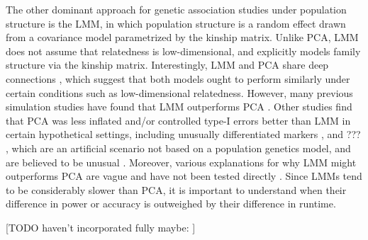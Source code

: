 \documentclass[11pt]{article}
\begin{document}
The other dominant approach for genetic association studies under population structure is the LMM, in which population structure is a random effect drawn from a covariance model parametrized by the kinship matrix.
Unlike PCA, LMM does not assume that relatedness is low-dimensional, and explicitly models family structure via the kinship matrix.
Interestingly, LMM and PCA share deep connections \citep{astle_population_2009, janss_inferences_2012, hoffman_correcting_2013}, which suggest that both models ought to perform similarly under certain conditions such as low-dimensional relatedness.
However, many previous simulation studies have found that LMM outperforms PCA \citep{
  zhao_arabidopsis_2007,
  astle_population_2009,
  kang_variance_2010,
  wu_comparison_2011, %
  song_testing_2015}.
Other studies find that PCA was less inflated and/or controlled type-I errors better than LMM in certain hypothetical settings, including unusually differentiated markers \citep{price_new_2010, wu_comparison_2011}, and ??? \citep{wang_analytical_2013}, which are an artificial scenario not based on a population genetics model, and are believed to be unusual \citep{sul_mixed_2013}.
Moreover, various explanations for why LMM might outperforms PCA are vague and have not been tested directly \citep{price_new_2010, sul_mixed_2013, price_response_2013, hoffman_correcting_2013}.
Since LMMs tend to be considerably slower than PCA, it is important to understand when their difference in power or accuracy is outweighed by their difference in runtime.

[TODO haven't incorporated fully maybe: \citep{thornton_roadtrips:_2010}]
\end{document}
